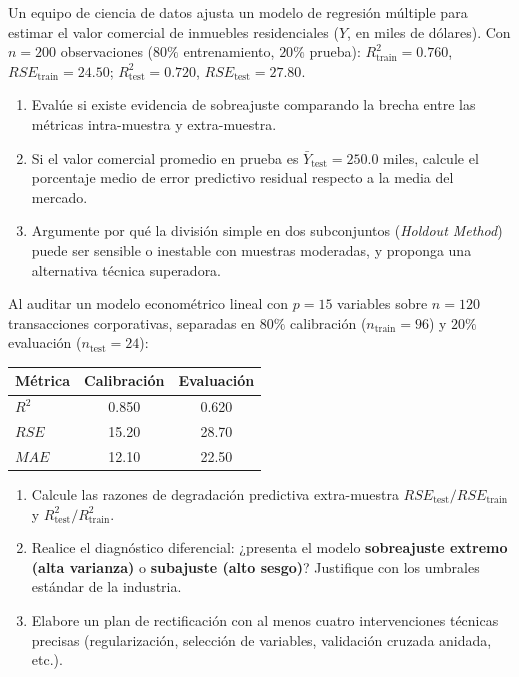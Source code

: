 \begin{problema}
	\label{prob:7d813ee}
	Un equipo de ciencia de datos ajusta un modelo de regresión múltiple para estimar el valor comercial de inmuebles residenciales ($Y$, en miles de dólares). Con $n = 200$ observaciones ($80\%$ entrenamiento, $20\%$ prueba): $R_{\text{train}}^2 = 0.760$, $RSE_{\text{train}} = 24.50$; $R_{\text{test}}^2 = 0.720$, $RSE_{\text{test}} = 27.80$.
	\begin{enumerate}
		\item Evalúe si existe evidencia de sobreajuste comparando la brecha entre las métricas intra-muestra y extra-muestra.
		\item Si el valor comercial promedio en prueba es $\bar{Y}_{\text{test}} = 250.0$ miles, calcule el porcentaje medio de error predictivo residual respecto a la media del mercado.
		\item Argumente por qué la división simple en dos subconjuntos (\emph{Holdout Method}) puede ser sensible o inestable con muestras moderadas, y proponga una alternativa técnica superadora.
	\end{enumerate}
\end{problema}

\begin{problema}
	\label{prob:d0d57bc}
	Al auditar un modelo econométrico lineal con $p = 15$ variables sobre $n = 120$ transacciones corporativas, separadas en $80\%$ calibración ($n_{\text{train}}=96$) y $20\%$ evaluación ($n_{\text{test}}=24$):
	\begin{center}
		\begin{tabular}{|l|c|c|}
			\hline
			\textbf{Métrica} & \textbf{Calibración} & \textbf{Evaluación} \\ \hline
			$R^2$ & 0.850 & 0.620 \\
			$RSE$ & 15.20 & 28.70 \\
			$MAE$ & 12.10 & 22.50 \\ \hline
		\end{tabular}
	\end{center}
	\begin{enumerate}
		\item Calcule las razones de degradación predictiva extra-muestra $RSE_{\text{test}}/RSE_{\text{train}}$ y $R_{\text{test}}^2/R_{\text{train}}^2$.
		\item Realice el diagnóstico diferencial: ¿presenta el modelo \textbf{sobreajuste extremo (alta varianza)} o \textbf{subajuste (alto sesgo)}? Justifique con los umbrales estándar de la industria.
		\item Elabore un plan de rectificación con al menos cuatro intervenciones técnicas precisas (regularización, selección de variables, validación cruzada anidada, etc.).
	\end{enumerate}
\end{problema}

